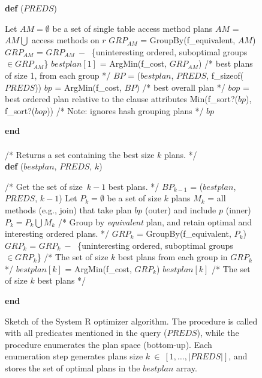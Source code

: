 \begin{figure*}
\ssp
\footnotesize
\centering
\begin{boxedminipage}{\linewidth}
  {\bf def} ($PREDS$)
    \begin{algorithmic}[1]
	\STATE Let $AM = \emptyset$ be a set of single table access method plans
		\STATE $AM$ = $AM \bigcup$ access methods on $r$
  	\ENDFOR
	\STATE
	\STATE $GRP_{AM}$ = GroupBy(f\_equivalent, $AM$)
	\STATE $GRP_{AM}$ = $GRP_{AM}\ -\ $ \{uninteresting ordered, suboptimal groups $\in GRP_{AM}$\}
	\STATE $bestplan[1]$ = ArgMin(f\_cost, $GRP_{AM}$) /* best plans of size 1, from each group */
	\STATE $BP$ = ($bestplan$, $PREDS$, f\_sizeof($PREDS$)) 
	\STATE $bp$ = ArgMin(f\_cost, $BP$) /* best overall plan */
	\STATE
		\STATE $bop$ = best ordered plan relative to the clause attributes
		\RETURN Min(f\_sort?($bp$), f\_sort?($bop$)) /* Note: ignores hash grouping plans */
	\ELSE
	 	\RETURN $bp$
	\ENDIF
    \end{algorithmic}
  {\bf end}
  \\
  \\
  /* Returns a set containing the best size $k$ plans. */ \\
  {\bf def} ($bestplan$, $PREDS$, $k$)
    \begin{algorithmic}[1]
	\STATE /* Get the set of size~$k-1$ best plans. */
	\STATE $BP_{k-1}$ = ($bestplan$, $PREDS$, $k-1$)
	\STATE Let $P_{k} = \emptyset$ be a set of size $k$ plans
		\STATE $M_k$ = all methods (e.g., join) that take 
			       plan $bp$ (outer) and include $p$ (inner)
		\STATE $P_{k} = P_{k} \bigcup M_k$ 
		\ENDFOR
	\ENDFOR
	\STATE
	\STATE /* Group by {\em equivalent} plan, and retain optimal and interesting ordered plans. */
	\STATE $GRP_{k}$ = GroupBy(f\_equivalent, $P_{k}$)
	\STATE $GRP_{k}$ = $GRP_{k}\ -\ $ \{uninteresting ordered, suboptimal groups $\in GRP_{k}$\}
	\STATE
	\STATE /* The set of size $k$ best plans from each group in $GRP_k$ */
	\STATE $bestplan[k]$ = ArgMin(f\_cost, $GRP_{k}$) 
	\ENDIF
	\RETURN $bestplan[k]$ /* The set of size $k$ best plans */
      \end{algorithmic}
    {\bf end}
\end{boxedminipage}
\caption{\label{ch:opt:fig:systemr}
Sketch of the System R optimizer algorithm.  The  procedure is called
with all predicates mentioned in the query ($PREDS$), while the  procedure 
enumerates the plan space (bottom-up). Each enumeration step generates plans 
size $k~\in~[1, \ldots, |PREDS|]$, and stores the set of optimal plans in the
$bestplan$ array.
}
\end{figure*}

